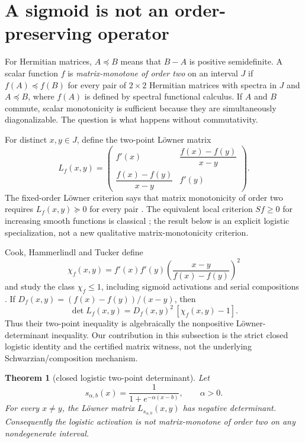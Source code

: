\documentclass[11pt]{article}
\newtheorem{theorem}{Theorem}[section]
\begin{document}
\section{A sigmoid is not an order-preserving operator}

For Hermitian matrices, $A\preceq B$ means that $B-A$ is positive semidefinite.  A scalar function $f$ is
\emph{matrix-monotone of order two} on an interval $J$ if $f(A)\preceq f(B)$ for every pair of $2\times2$
Hermitian matrices with spectra in $J$ and $A\preceq B$, where $f(A)$ is defined by spectral functional calculus.
If $A$ and $B$ commute, scalar monotonicity is sufficient because they are simultaneously diagonalizable.  The
question is what happens without commutativity.

For distinct $x,y\in J$, define the two-point L\"owner matrix
\begin{equation}
 L_f(x,y)=
 \begin{pmatrix}
  f'(x)&\dfrac{f(x)-f(y)}{x-y}\\[5pt]
  \dfrac{f(x)-f(y)}{x-y}&f'(y)
 \end{pmatrix}.
 \label{eq:loewnermatrix}
\end{equation}
The fixed-order L\"owner criterion says that matrix monotonicity of order two requires
$L_f(x,y)\succeq0$ for every pair \cite{hiai2010,heinavaara2019}.  The equivalent local criterion
$Sf\ge0$ for increasing smooth functions is classical \cite[Lemma 10]{kozlovski2008}; the result below is an
explicit logistic specialization, not a new qualitative matrix-monotonicity criterion.

Cook, Hammerlindl and Tucker define
\[
 \chi_f(x,y)=f'(x)f'(y)
 \left(\frac{x-y}{f(x)-f(y)}\right)^2
\]
and study the class $\chi_f\le1$, including sigmoid activations and serial compositions \cite{cook2023}.  If
$D_f(x,y)=(f(x)-f(y))/(x-y)$, then
\begin{equation}
 \det L_f(x,y)=D_f(x,y)^2\,[\chi_f(x,y)-1].
 \label{eq:coexpanding}
\end{equation}
Thus their two-point inequality is algebraically the nonpositive L\"owner-determinant inequality.  Our contribution
in this subsection is the strict closed logistic identity and the certified matrix witness, not the underlying
Schwarzian/composition mechanism.

\begin{theorem}[closed logistic two-point determinant]
\label{thm:loewner}
Let
\[
 s_{\alpha,b}(x)=\frac1{1+e^{-\alpha(x-b)}},\qquad \alpha>0.
\]
For every $x\ne y$, the L\"owner matrix $L_{s_{\alpha,b}}(x,y)$ has negative determinant.  Consequently the
logistic activation is not matrix-monotone of order two on any nondegenerate interval.
\end{theorem}
\end{document}
